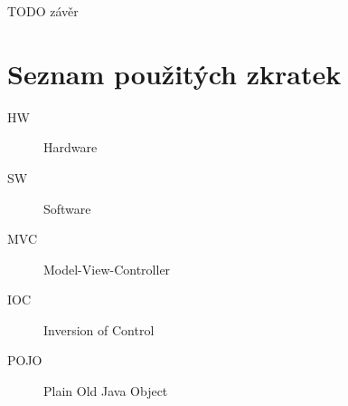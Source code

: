 \documentclass[thesis=B,czech]{FITthesis}[2012/06/26]
\begin{document}
\begin{conclusion}
	TODO závěr
\end{conclusion}




\appendix

\chapter{Seznam použitých zkratek}
\begin{description}
	\item[HW] Hardware
	\item[SW] Software
	\item[MVC] Model-View-Controller
	\item[IOC] Inversion of Control
	\item[POJO] Plain Old Java Object
\end{description}
\end{document}
